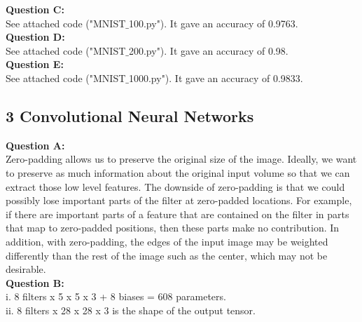 \documentclass[12 pt]{article}
\begin{document}
	
	\noindent\textbf{Question C:}  \\ See attached code ("MNIST$\_$100.py"). It gave an accuracy of 0.9763. \\
	
	\noindent\textbf{Question D:} \\ See attached code ("MNIST$\_$200.py"). It gave an accuracy of 0.98.\\
	
	\noindent\textbf{Question E:} \\ See attached code ("MNIST$\_$1000.py"). It gave an accuracy of 0.9833.\\

	\subsection*{3 Convolutional Neural Networks}
	\noindent\textbf{Question A:} \\
	Zero-padding allows us to preserve the original size of the image. Ideally, we want to preserve as much information about the original input volume so that we can extract those low level features. The downside of zero-padding is that we could possibly lose important parts of the filter at zero-padded locations. For example, if there are important parts of a feature that are contained on the filter in parts that map to zero-padded positions, then these parts make no contribution. In addition, with zero-padding, the edges of the input image may be weighted differently than the rest of the image such as the center, which may not be desirable. \\

	
	\noindent\textbf{Question B:} \\
	i. 8 filters x 5 x 5 x 3 + 8 biases = 608 parameters. \\
	ii. 8 filters x 28 x 28 x 3 is the shape of the output tensor.\\
	
\end{document}
